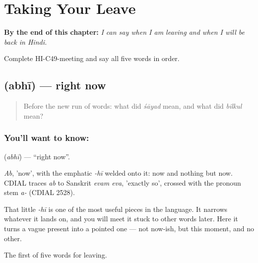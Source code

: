 
\chapter{Taking Your Leave}
\label{ch:hi-taking-leave}

\begin{chapteropening}
\textbf{By the end of this chapter:} \emph{I can say when I am leaving and when I will be back in Hindi.}

Complete HI-C49-meeting and say all five words in order.
\end{chapteropening}

\section[\texorpdfstring{\hi{अभी} (abhī)}{अभी (abhī)}]{ (abhī) — right now}

\label{lesson:HI-C49-now}



\begin{quote}
Before the new run of words: what did \emph{śāyad} mean, and what did \emph{bilkul} mean?
\end{quote}

\subsection*{You'll want to know: }
\textbf{} (\emph{abhī}) — \textquotedblleft{}right now\textquotedblright{}.

\emph{Ab}, 'now', with the emphatic \emph{-hī} welded onto it: now and nothing but now. CDIAL traces \emph{ab} to Sanskrit \emph{evam eva}, 'exactly so', crossed with the pronoun stem \emph{a-} (CDIAL 2528).

That little \emph{-hī} is one of the most useful pieces in the language. It narrows whatever it lands on, and you will meet it stuck to other words later. Here it turns a vague present into a pointed one — not now-ish, but this moment, and no other.

\begin{grammarlens}[title={What you've built}]
The first of five words for leaving.
\end{grammarlens}

